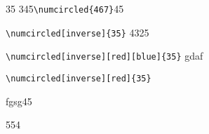 \documentclass{article}
\begin{document}
35 345\verb|\numcircled{467}|45

 \verb|\numcircled[inverse]{35}| 4325
 
  \verb|\numcircled[inverse][red][blue]{35}| gdaf
  
   \verb|\numcircled[inverse][red]{35}|

fgsg45
   
\newcommand{\wcnt}{}

\wcnt5\wcnt5\wcnt4\wcnt
\end{document}
